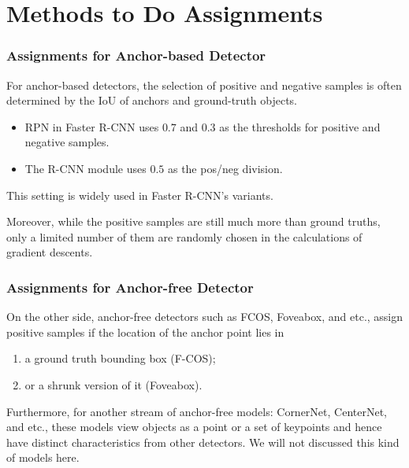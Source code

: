 \documentclass[slidetop, mathserif, dvipsnames]{beamer}
\begin{document}
\section{Methods to Do Assignments}

\begin{frame}
    \frametitle{Assignments for Anchor-based Detector}

    For anchor-based detectors, the selection of positive and negative samples
    is often determined by the IoU of anchors and ground-truth objects.

    \begin{itemize}
    \item RPN in Faster R-CNN uses $0.7$ and $0.3$ as the thresholds for positive
        and negative samples.
    \item The R-CNN module uses $0.5$ as the pos/neg division.
    \end{itemize}
    This setting is widely used in Faster R-CNN's variants.

    Moreover, while the positive samples are still much more than ground truths,
    only a limited number of them are randomly chosen in the calculations of
    gradient descents.

\end{frame}

\begin{frame}
    \frametitle{Assignments for Anchor-free Detector}

    On the other side, anchor-free detectors such as FCOS, Foveabox, and etc.,
    assign positive samples if the location of the anchor point lies in
    \begin{enumerate}
    \item a ground truth bounding box (F-COS);
    \item or a shrunk version of it (Foveabox).
    \end{enumerate}

    \quad

    Furthermore, for another stream of anchor-free models:
    CornerNet, CenterNet, and etc., these models view objects as a point or
    a set of keypoints and hence have distinct characteristics from other
    detectors. We will not discussed this kind of models here.
    
\end{frame}
\end{document}
